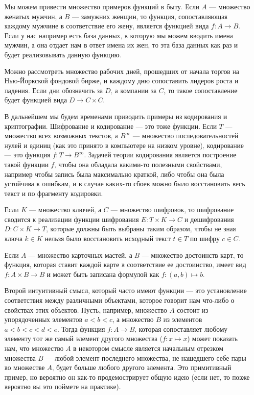 Мы можем привести множество примеров функций в быту. Если $A$ — множество женатых мужчин, а $B$ — замужних женщин, то функция, сопоставляющая каждому мужчине в соответствие его жену, является функцией вида $f: A\to B$. Если у нас например есть база данных, в которую мы можем вводить имена мужчин, а она отдает нам в ответ имена их жен, то эта база данных как раз и будет реализовывать данную функцию.

Можно рассмотреть множество рабочих дней, прошедших от начала торгов на Нью-Йоркской фондовой бирже, и каждому дню сопоставить лидеров роста и падения. Если дни обозначить за $D$, а компании за $C$, то такое сопоставление будет функцией вида $D\to C\times C$.

В дальнейшем мы будем временами приводить примеры из кодирования и криптографии. Шифрование и кодирование — это тоже функции. Если $T$ — множество всех возможных текстов, а $B^\infty$ — множество последовательностей нулей и единиц (как это принято в компьютере на низком уровне), кодирование — это функция $f:T\to B^\infty$. Задачей теории кодирования является построение такой функции $f$, чтобы она обладала какими-то полезными свойствами, например чтобы запись была максимально краткой, либо чтобы она была устойчива к ошибкам, и в случае каких-то сбоев можно было восстановить весь текст и по фрагменту кодировки.

Если $K$ — множество ключей, а $C$ — множество шифровок, то шифрование сводится к реализации функции шифрования $E: T\times K \to C$ и дешифрования $D: C\times K \to T$, которые должны быть выбраны таким образом, чтобы не зная ключа $k\in K$ нельзя было восстановить исходный текст $t \in T$ по шифру $c \in C$.

Если $A$ — множество карточных мастей, а $B$ — множество достоинств карт, то функция, которая ставит каждой карте в соответствие ее достоинство, имеет вид $f: A\times B \to B$ и может быть записана формулой как $f: (a, b) \mapsto b$.

Второй интуитивный смысл, который часто имеют функции — это установление соответствия между различными объектами, которое говорит нам что-либо о свойствах этих объектов. Пусть, например, множество $A$ состоит из упорядоченных элементов $a<b<c$, а множество $B$ из элементов $a<b<c<d<e$. Тогда функция $f:A \to B$, которая сопоставляет любому элементу тот же самый элемент другого множества ($f: x\mapsto x$) может показать нам, что множество $A$ в некотором смысле является начальным отрезком множества $B$ — любой элемент последнего множества, не нашедшего себе пары во множестве $A$, будет больше любого другого элемента. Это примитивный пример, но вероятно он как-то продемострирует общую идею (если нет, то позже вероятно вы это поймете на практике).

